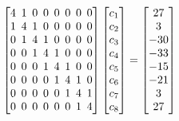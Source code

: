 \begin{equation}\setlength{\arraycolsep}{2.4pt}
\begin{bmatrix}4 & 1 & 0 & 0 & 0 & 0 & 0 & 0 \\ 1 & 4 & 1 & 0 & 0 & 0 & 0 & 0 \\ 0 & 1 & 4 & 1 & 0 & 0 & 0 & 0 \\ 0 & 0 & 1 & 4 & 1 & 0 & 0 & 0 \\ 0 & 0 & 0 & 1 & 4 & 1 & 0 & 0 \\ 0 & 0 & 0 & 0 & 1 & 4 & 1 & 0 \\ 0 & 0 & 0 & 0 & 0 & 1 & 4 & 1 \\ 0 & 0 & 0 & 0 & 0 & 0 & 1 & 4\end{bmatrix}
\begin{bmatrix}c_1\\c_2\\c_3\\c_4\\c_5\\c_6\\c_7\\c_8\end{bmatrix}=
\begin{bmatrix}27 \\ 3 \\ -30 \\ -33 \\ -15 \\ -21 \\ 3 \\ 27\end{bmatrix}
\label{eq:sistema}\end{equation}
